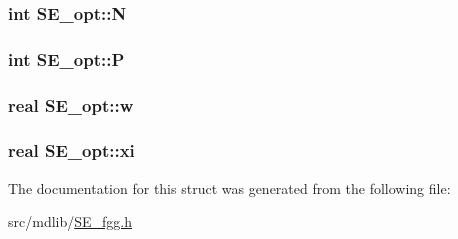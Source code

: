 \hypertarget{structSE__opt_a4ae1f1321d14e510c19457ae9fc5880c}{
\subsubsection[{\-N}]{\setlength{\rightskip}{0pt plus 5cm}int {\bf \-S\-E\-\_\-opt\-::\-N}}}\label{structSE__opt_a4ae1f1321d14e510c19457ae9fc5880c}
\hypertarget{structSE__opt_a1128eea0601dff3a1564c9ce21b09c68}{
\subsubsection[{\-P}]{\setlength{\rightskip}{0pt plus 5cm}int {\bf \-S\-E\-\_\-opt\-::\-P}}}\label{structSE__opt_a1128eea0601dff3a1564c9ce21b09c68}
\hypertarget{structSE__opt_a00118fc9290ca016043a73d6aa72a25a}{
\subsubsection[{w}]{\setlength{\rightskip}{0pt plus 5cm}real {\bf \-S\-E\-\_\-opt\-::w}}}\label{structSE__opt_a00118fc9290ca016043a73d6aa72a25a}
\hypertarget{structSE__opt_aa1790562e9882a0e41122a800190c175}{
\subsubsection[{xi}]{\setlength{\rightskip}{0pt plus 5cm}real {\bf \-S\-E\-\_\-opt\-::xi}}}\label{structSE__opt_aa1790562e9882a0e41122a800190c175}


\-The documentation for this struct was generated from the following file\-:\begin{DoxyCompactItemize}
\item 
src/mdlib/\hyperlink{SE__fgg_8h}{\-S\-E\-\_\-fgg.\-h}\end{DoxyCompactItemize}
